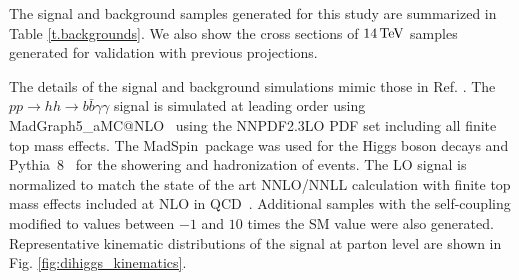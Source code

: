 
The signal and background samples generated for this study are summarized in Table \ref{t.backgrounds}. We also show the cross sections of $14\, {\rm TeV}$ samples generated for validation with previous projections. 

The details of the signal and background simulations mimic those in Ref. \cite{Homiller:2018xxx}. 
The $pp \rightarrow hh \rightarrow b\bar{b}\gamma\gamma$ signal is simulated at leading order using {\sc\small MadGraph5\_aMC@NLO}\ \cite{Alwall:2014hca, Hirschi:2015iia} using the NNPDF2.3LO PDF set \cite{Ball:2014uwa} including all finite top mass effects. The {\sc\small MadSpin}\ package \cite{Artoisenet:2012st} was used for the Higgs boson decays and {\sc\small Pythia~8}\ \cite{Sjostrand:2014zea} for the showering and hadronization of events. The LO signal is normalized to match the state of the art NNLO/NNLL calculation with finite top mass effects included at NLO in QCD~\cite{Grazzini:2018bsd}. Additional samples with the self-coupling modified to values between $-1$ and $10$ times the SM value were also generated. Representative kinematic distributions of the signal at parton level are shown in Fig. \ref{fig:dihiggs_kinematics}.

